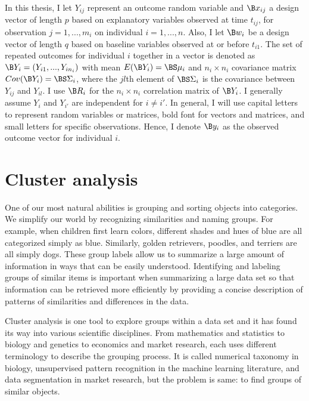 In this thesis, I let $Y_{ij}$ represent an outcome random variable and $\B x_{ij}$ a design vector of length $p$ based on explanatory variables observed at time $t_{ij}$, for observation $j=1,...,m_{i}$ on individual $i=1,...,n$. Also, I let $\B w_{i}$ be a design vector of length $q$ based on baseline variables observed at or before $t_{i1}$. The set of repeated outcomes for individual $i$ together in a vector is denoted as $\B Y_{i} = (Y_{i1},...,Y_{in_{i}})$ with mean $E(\B Y_{i}) = \BS\mu_{i}$ and $n_{i}\times n_{i}$ covariance matrix $Cov(\B Y_{i}) = \BS\Sigma_{i}$, where the $jl$th element of $\BS\Sigma_{i}$ is the covariance between $Y_{ij}$ and $Y_{il}$. I use $\B R_{i}$ for the $n_{i}\times n_{i}$ correlation matrix of $\B Y_{i}$. I generally assume $Y_{i}$ and $Y_{i'}$ are independent for $i\not = i'$. In general, I will use capital letters to represent random variables or matrices, bold font for vectors and matrices, and small letters for specific observations. Hence, I denote $\B y_{i}$ as the observed outcome vector for individual $i$. 

\section{Cluster analysis}
One of our most natural abilities is grouping and sorting objects into categories. We simplify our world by recognizing similarities and naming groups. For example, when children first learn colors, different shades and hues of blue are all categorized simply as blue. Similarly, golden retrievers, poodles, and terriers are all simply dogs. These group labels allow us to summarize a large amount of information in ways that can be easily understood. Identifying and labeling groups of similar items is important when summarizing a large data set so that information can be retrieved more efficiently by providing a concise description of patterns of similarities and differences in the data. 

Cluster analysis is one tool to explore groups within a data set and it has found its way into various scientific disciplines. From mathematics and statistics to biology and genetics to economics and market research, each uses different terminology to describe the grouping process. It is called numerical taxonomy in biology, unsupervised pattern recognition in the machine learning literature, and data segmentation in market research, but the problem is same: to find groups of similar objects.
 
